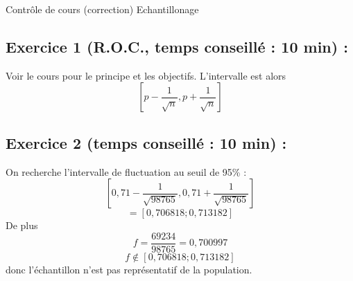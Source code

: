 

\usepackage[c]{esvect}
\newcommand{\covec}[2]{\begin{pmatrix}#1 \\#2 \end{pmatrix}}




\center
\Large Contrôle de cours (correction)
\flushleft
\center
Echantillonage
\flushleft \normalsize
\subsection*{Exercice 1 (R.O.C., temps conseillé : 10 min) : }
Voir le cours pour le principe et les objectifs. L'intervalle est alors $$\left[p-\frac{1}{\sqrt{n}},p+\frac{1}{\sqrt{n}}\right]$$
\subsection*{Exercice 2 (temps conseillé : 10 min) : }
On recherche l'intervalle de fluctuation au seuil de 95\% : 
$$\left[0,71-\frac{1}{\sqrt{98765}},0,71+\frac{1}{\sqrt{98765}}\right]$$
$$=[0,706818;0,713182]$$
De plus
$$f=\frac{69234}{98765} = 0,700997$$
$$f\notin[0,706818;0,713182]$$
donc l'échantillon n'est pas représentatif de la population.
